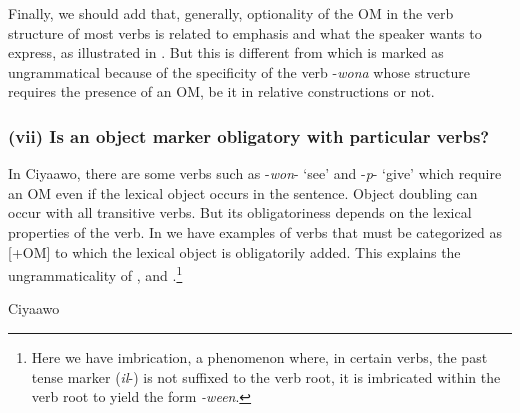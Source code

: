 \documentclass[output=paper]{langscibook}
\begin{document}
Finally, we should add that, generally, optionality of the OM in the verb structure of most verbs is related to emphasis and what the speaker wants to express, as illustrated in . But this is different from  which is marked as ungrammatical because of the specificity of the verb -\textit{wona} whose structure requires the presence of an OM, be it in relative constructions or not.

\subsubsection{(vii) Is an object marker obligatory with particular verbs?}

In Ciyaawo, there are some verbs such as -\textit{won}{}- ‘see’ and -\textit{p}{}- ‘give’ which require an OM even if the lexical object occurs in the sentence. Object doubling can occur with all transitive verbs. But its obligatoriness depends on the lexical properties of the verb. In  we have examples of verbs that must be categorized as [+OM] to which the lexical object is obligatorily added. This explains the ungrammaticality of ,  and .\footnote{Here we have imbrication, a phenomenon where, in certain verbs, the past tense marker (\textit{il}-) is not suffixed to the verb root, it is imbricated within the verb root to yield the form \textit{-ween}. }

\ea\label{ex:ngunga:57}  Ciyaawo 


\z
\ex\label{ex:ngunga:58}
  
\end{document}
